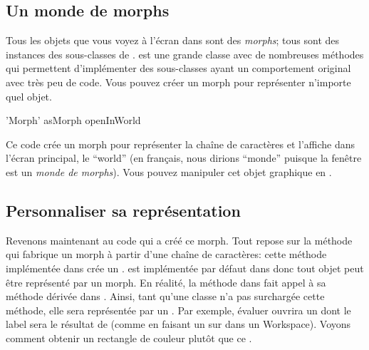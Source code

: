 \documentclass[a4paper,10pt,twoside]{book}
\begin{document}
\subsection{Un monde de morphs}
Tous les objets que vous voyez à l'écran dans \pharo sont des
\emph{morphs}; tous sont des instances des sous-classes de .
\mbox{} est une grande classe avec de nombreuses méthodes
qui permettent d'implémenter des sous-classes ayant un comportement
original avec très peu de code.
Vous pouvez créer un morph pour représenter n'importe quel objet. 


\begin{code}{}
'Morph' asMorph openInWorld
\end{code}

Ce code crée un morph pour représenter la chaîne
de caractères  et l'affiche dans
l'écran principal, le ``world'' (en français, nous dirions
``monde'' puisque la fenêtre \pharo est un \emph{monde de morphs}).
Vous pouvez manipuler cet objet graphique en \metaclickant{}.


\subsection{Personnaliser sa représentation}

Revenons maintenant au code qui a créé ce morph.%
Tout repose sur la méthode qui fabrique un morph à partir d'une
chaîne de caractères:
cette méthode  implémentée dans
 crée un .  est
implémentée par défaut dans  donc tout objet peut
être représenté par un morph. En réalité, la méthode
 dans  fait appel à sa méthode dérivée
dans . Ainsi, tant qu'une classe n'a pas surchargée cette
méthode, elle sera représentée par un .
Par exemple, évaluer  ouvrira un
 dont le label sera le résultat de 
 (comme en faisant un  sur 
dans un Workspace).
Voyons comment obtenir un rectangle de couleur plutôt que ce
.
\end{document}
